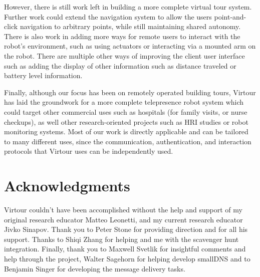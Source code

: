 \documentclass[
  oneside,
  11pt, a4paper,
  footinclude=true,
  headinclude=true,
  cleardoublepage=empty
]{article}
\begin{document}
However, there is still work left in building a more complete virtual tour
system. Further work could extend the navigation system to allow the users
point-and-click navigation to arbitrary points, while still maintaining shared
autonomy. There is also work in adding more ways for remote users to interact
with the robot's environment, such as using actuators or interacting via a
mounted arm on the robot. There are multiple other ways of improving the client
user interface such as adding the display of other information such as distance
traveled or battery level information.

Finally, although our focus has been on remotely operated building tours,
Virtour has laid the groundwork for a more complete telepresence robot system
which could target other commercial uses such as hospitals (for family visits,
or nurse checkups), as well other research-oriented projects such as HRI
studies or robot monitoring systems. Most of our work is directly applicable
and can be tailored to many different uses, since the communication,
authentication, and interaction protocols that Virtour uses can be independently
used.

\section{Acknowledgments}\label{sec:acks}

Virtour couldn't have been accomplished without the help and support of my
original research educator Matteo Leonetti, and my current research educator
Jivko Sinapov. Thank you to Peter Stone for providing direction and for all his
support. Thanks to Shiqi Zhang for helping and me with the scavenger hunt
integration. Finally, thank you to Maxwell Svetlik for insightful comments and
help through the project, Walter Sagehorn for helping develop smallDNS and to
Benjamin Singer for developing the message delivery tasks.

\nocite{*}


    
\end{document}
